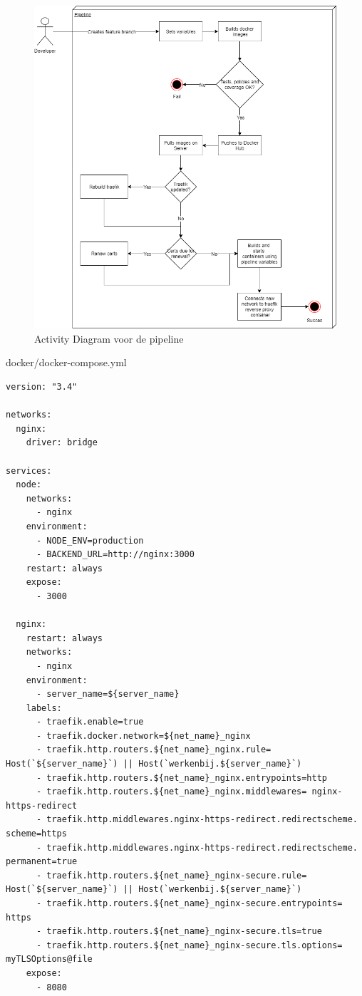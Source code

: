 \begin{figure}[H]
	\centering
	\includegraphics[width=13cm]{Figures/Activitydiagram}
	\decoRule
	\caption[Pipeline Activity Diagram]{Activity Diagram voor de pipeline}
	\label{fig:activitydiagram}
\end{figure}

docker/docker-compose.yml
\begin{verbatim}
version: "3.4"

networks:
  nginx:
    driver: bridge

services:
  node:
    networks:
      - nginx
    environment:
      - NODE_ENV=production
      - BACKEND_URL=http://nginx:3000
    restart: always
    expose:
      - 3000

  nginx:
    restart: always
    networks:
      - nginx
    environment:
      - server_name=${server_name}
    labels:
      - traefik.enable=true
      - traefik.docker.network=${net_name}_nginx
      - traefik.http.routers.${net_name}_nginx.rule= Host(`${server_name}`) || Host(`werkenbij.${server_name}`)
      - traefik.http.routers.${net_name}_nginx.entrypoints=http
      - traefik.http.routers.${net_name}_nginx.middlewares= nginx-https-redirect
      - traefik.http.middlewares.nginx-https-redirect.redirectscheme. scheme=https
      - traefik.http.middlewares.nginx-https-redirect.redirectscheme. permanent=true
      - traefik.http.routers.${net_name}_nginx-secure.rule= Host(`${server_name}`) || Host(`werkenbij.${server_name}`)
      - traefik.http.routers.${net_name}_nginx-secure.entrypoints= https
      - traefik.http.routers.${net_name}_nginx-secure.tls=true
      - traefik.http.routers.${net_name}_nginx-secure.tls.options= myTLSOptions@file
    expose:
      - 8080
\end{verbatim}

